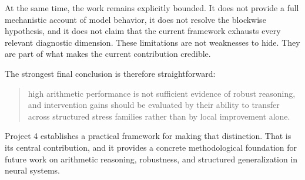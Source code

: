 \documentclass[11pt]{article}
\begin{document}
At the same time, the work remains explicitly bounded. It does not provide a full mechanistic account of model behavior, it does not resolve the blockwise hypothesis, and it does not claim that the current framework exhausts every relevant diagnostic dimension. These limitations are not weaknesses to hide. They are part of what makes the current contribution credible.

The strongest final conclusion is therefore straightforward:

\begin{quote}
high arithmetic performance is not sufficient evidence of robust reasoning, and intervention gains should be evaluated by their ability to transfer across structured stress families rather than by local improvement alone.
\end{quote}

Project 4 establishes a practical framework for making that distinction. That is its central contribution, and it provides a concrete methodological foundation for future work on arithmetic reasoning, robustness, and structured generalization in neural systems.
\end{document}
